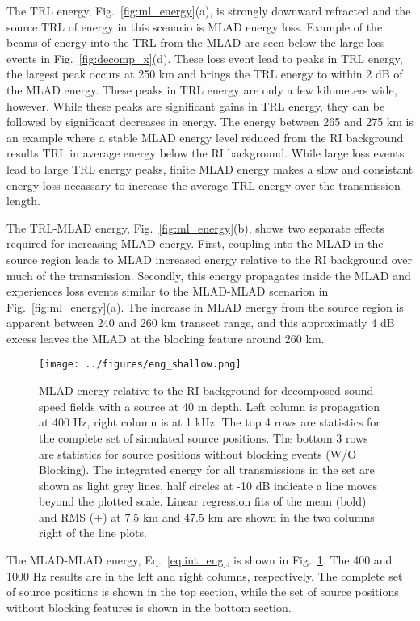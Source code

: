 \documentclass[preprint,NumberedRefs]{JASA}
\begin{document}
The TRL energy, Fig.~\ref{fig:ml_energy}(a), is strongly downward refracted and the source TRL of energy in this scenario is MLAD energy loss. Example of the beams of energy into the TRL from the MLAD are seen below the large loss events in Fig.~\ref{fig:decomp_x}(d). These loss event lead to peaks in TRL energy, the largest peak occurs at 250 km and brings the TRL energy to within 2 dB of the MLAD energy. These peaks in TRL energy are only a few kilometers wide, however. While these peaks are significant gains in TRL energy, they can be followed by significant decreases in energy. The energy between 265 and 275 km is an example where a stable MLAD energy level reduced from the RI background results TRL in average energy below the RI background. While large loss events lead to large TRL energy peaks, finite MLAD energy makes a slow and consistant energy loss necassary to increase the average TRL energy over the transmission length.

The TRL-MLAD energy, Fig.~\ref{fig:ml_energy}(b), shows two separate effects required for increasing MLAD energy. First, coupling into the MLAD in the source region leads to MLAD increased energy relative to the RI background over much of the transmission. Secondly, this energy propagates inside the MLAD and experiences loss events similar to the MLAD-MLAD scenarion in Fig.~\ref{fig:ml_energy}(a). The increase in MLAD energy from the source region is apparent between 240 and 260 km transcet range, and this approximatly 4 dB excess leaves the MLAD at the blocking feature around 260 km.

\begin{figure}
\texttt{[image: ../figures/eng\_shallow.png]}
    \caption{MLAD energy relative to the RI background for decomposed sound speed fields with a source at 40 m depth. Left column is propagation at 400 Hz, right column is at 1 kHz. The top 4 rows are statistics for the complete set of simulated source positions. The bottom 3 rows are statistics for source positions without blocking events (W/O Blocking). The integrated energy for all transmissions in the set are shown as light grey lines, half circles at -10 dB indicate a line moves beyond the plotted scale. Linear regression fits of the mean (bold) and RMS ($\pm$) at 7.5 km and 47.5 km are shown in the two columns right of the line plots.}
    \label{fig:shal_eng}
\end{figure}
The MLAD-MLAD energy, Eq.~\eqref{eq:int_eng}, is shown in Fig.~\ref{fig:shal_eng}. The 400 and 1000 Hz results are in the left and right columns, respectively. The complete set of source positions is shown in the top section, while the set of source positions without blocking features is shown in the bottom section.
\end{document}
